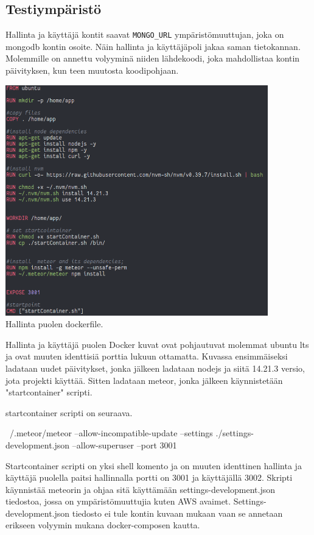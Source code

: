 \medskip


\subsection*{Testiympäristö}


Hallinta ja käyttäjä kontit saavat \verb"MONGO_URL" ympäristömuuttujan, joka on mongodb kontin osoite. Näin hallinta ja käyttäjäpoli jakaa saman tietokannan.
Molemmille on annettu volyyminä niiden lähdekoodi, joka mahdollistaa kontin päivityksen, kun teen muutosta koodipohjaan.
\medbreak

\medskip

\includegraphics[height=10cm]{src/public/dockerfile.png} \\
Hallinta puolen dockerfile.
\medskip

Hallinta ja käyttäjä puolen Docker kuvat ovat pohjautuvat molemmat ubuntu lts ja ovat muuten identtisiä porttia lukuun ottamatta.
Kuvassa ensimmäiseksi ladataan uudet päivitykset, jonka jälkeen ladataan nodejs ja siitä 14.21.3 versio, jota projekti käyttää.
Sitten ladataan meteor, jonka jälkeen käynnistetään "startcontainer"{} scripti.
\medskip

startcontainer scripti on seuraava. 
\medskip
\begin{tcolorbox}
~/.meteor/meteor --allow-incompatible-update --settings ./settings-development.json --allow-superuser --port 3001
\end{tcolorbox}

Startcontainer scripti on yksi shell komento ja on muuten identtinen hallinta ja käyttäjä puolella paitsi hallinnalla portti on 3001 ja käyttäjällä 3002.
Skripti käynnistää meteorin ja ohjaa sitä käyttämään settings-development.json tiedostoa, jossa on ympäristömuuttujia kuten AWS avaimet.
Settings-development.json tiedosto ei tule kontin kuvaan mukaan vaan se annetaan erikseen volyymin mukana docker-composen kautta.
\medskip

